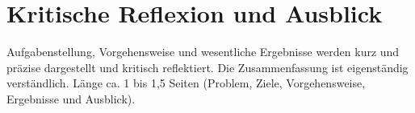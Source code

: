 \chapter{Kritische Reflexion und Ausblick}
\label{cha:reflexion}
Aufgabenstellung, Vorgehensweise und wesentliche Ergebnisse werden kurz und präzise dargestellt und kritisch reflektiert. Die Zusammenfassung ist eigenständig verständlich. Länge ca. 1 bis 1,5 Seiten (Problem, Ziele, Vorgehensweise, Ergebnisse und Ausblick).